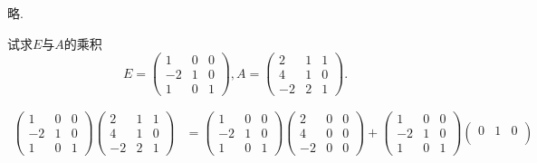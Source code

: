 ﻿\documentclass{book} \usepackage{exsheets} \usepackage{xeCJK}
\begin{document}
\begin{question}
  略.
\end{question}
\begin{question}
  试求$E$与$A$的乘积
$$
E=
\begin{pmatrix}
  1&0&0\\
  -2&1&0\\
  1&0&1
\end{pmatrix},A=
\begin{pmatrix}
  2&1&1\\
  4&1&0\\
  -2&2&1
\end{pmatrix}.
$$
\end{question}
\begin{solution}
  \begin{align*}
    \begin{pmatrix}
      1&0&0\\
      -2&1&0\\
      1&0&1
    \end{pmatrix}
           \begin{pmatrix}
             2&1&1\\
             4&1&0\\
             -2&2&1
           \end{pmatrix}&=
                          \begin{pmatrix}
                            1&0&0\\
                            -2&1&0\\
                            1&0&1
                          \end{pmatrix}
                                 \begin{pmatrix}
                                   2&0&0\\
                                   4&0&0\\
                                   -2&0&0
                                 \end{pmatrix}+\begin{pmatrix}
                                   1&0&0\\
                                   -2&1&0\\
                                   1&0&1
                                 \end{pmatrix}
                                        \begin{pmatrix}
                                          0&1&0\\

\end{pmatrix}
\end{align*}
\end{solution}
\end{document}
